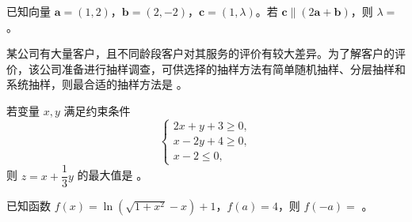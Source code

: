 \begin{question}
已知向量 $\boldsymbol a = (1, 2)$，$\boldsymbol b = (2, -2)$，$\boldsymbol c = (1, \lambda)$。若 $\boldsymbol c \parallel (2\boldsymbol a + \boldsymbol b)$，则 $\lambda =$ \underline{\hspace{2cm}}。

\end{question}
\begin{question}
某公司有大量客户，且不同龄段客户对其服务的评价有较大差异。为了解客户的评价，该公司准备进行抽样调查，可供选择的抽样方法有简单随机抽样、分层抽样和系统抽样，则最合适的抽样方法是 \underline{\hspace{2cm}}。

\end{question}
\begin{question}
若变量 $x, y$ 满足约束条件
\nopagebreak[4]
\[
\begin{cases}
2x + y + 3 \geqslant 0, \\
x - 2y + 4 \geqslant 0, \\
x - 2 \leqslant 0,
\end{cases}
\]
则 $z = x + \dfrac13 y$ 的最大值是 \underline{\hspace{2cm}}。

\end{question}
\begin{question}
已知函数 $f(x) = \ln(\sqrt{1 + x^2} - x) + 1$，$f(a) = 4$，则 $f(-a) =$ \underline{\hspace{2cm}}。

\par\medskip

\end{question}


